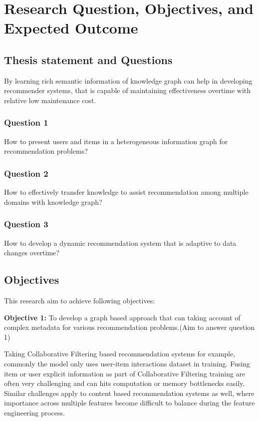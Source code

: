 \section{Research Question, Objectives, and Expected Outcome}

\subsection{Thesis statement and Questions}
By learning rich semantic information of knowledge graph can help in developing recommender systems, that is capable of maintaining effectiveness overtime with relative low maintenance cost. 

\subsubsection*{Question 1}
How to present users and items in a heterogeneous information graph for recommendation problems?

\subsubsection*{Question 2}
How to effectively transfer knowledge to assist recommendation among multiple domains with knowledge graph?

\subsubsection*{Question 3}
How to develop a dynamic recommendation system that is adaptive to data changes overtime?

\subsection{Objectives}
This research aim to achieve following objectives: 

\bigskip
\textbf{Objective 1:} To develop a graph based approach that can taking account of complex metadata for various recommendation problems.(Aim to answer question 1)

Taking Collaborative Filtering based recommendation systems for example, commonly the model only uses user-item interactions dataset in training. Fusing item or user explicit information as part of Collaborative Filtering training are often very challenging and can hits computation or memory bottlenecks easily. Similar challenges apply to content based recommendation systems as well, where importance across multiple features become difficult to balance during the feature engineering process.

